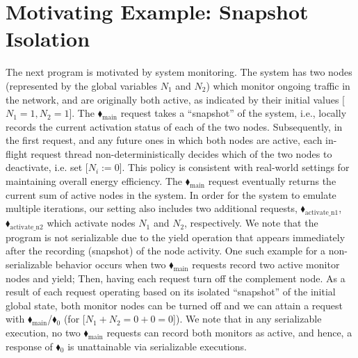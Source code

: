 \appendix

\section{Motivating Example: Snapshot Isolation}
\label{appendix:snapshotIsolationExample}



The next program is motivated by system monitoring.
The system has two nodes (represented by the global variables $N_1$ and $N_2$) which monitor ongoing traffic in the network, and are originally both active, as indicated by their initial values [$N_1=1,N_2=1$].
%
The {\color{ForestGreen}$\blacklozenge_\text{main}$} request takes a ``snapshot'' of the system, i.e., locally records the current activation status of each of the two nodes.
%
Subsequently, in the first request, and any future ones in which both nodes are active, each in-flight request thread  non-deterministically decides which of the two nodes to deactivate, i.e. set [$N_i:=0$]. This policy is consistent with real-world settings for maintaining overall energy efficiency.
%
The {\color{ForestGreen}$\blacklozenge_\text{main}$} request eventually returns the current sum of active nodes in the system.
%
In order for the system to emulate multiple iterations, our setting also includes two additional requests, {\color{ForestGreen}$\blacklozenge_\text{activate\_n1}$},{\color{ForestGreen}$\blacklozenge_\text{activate\_n2}$} which activate nodes $N_1$ and $N_2$, respectively.
%
We note that the program is not serializable due to the yield operation that appears immediately after the recording (snapshot) of the node activity. One such example for a non-serializable behavior occurs when two {\color{ForestGreen}$\blacklozenge_\text{main}$} requests record two active monitor nodes and yield; Then, having each request turn off the complement node. As a result of each request operating based on its isolated ``snapshot'' of the initial global state, both monitor nodes can be turned off and we can attain a request with {\color{ForestGreen}$\blacklozenge_\text{main}$}/{\color{red}$\blacklozenge_0$} (for [$N_1+N_2=0+0=0$]).
%
We note that in any serializable execution, no two {\color{ForestGreen}$\blacklozenge_\text{main}$} requests can record both monitors as active, and hence, a response of {\color{red}$\blacklozenge_0$} is unattainable via serializable executions.




